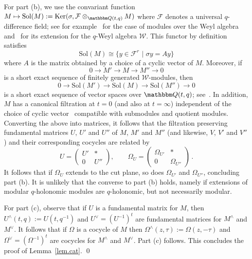 \documentclass[12pt,reqno]{amsart}
\theoremstyle{definition}
\def\BQ{\mathbbm Q}
\def\calF{\mathcal F}
\def\calW{\mathcal W}
\def\s{\sigma}
\def\be{\begin{equation}}
\def\ee{\end{equation}}
\def\Om{\Omega}
\def\Sol{\mathrm{Sol}}
\def\Ker{\mathrm{Ker}}
\begin{document}
For part (b), we use the convariant function
$M \mapsto \Sol(M):=\Ker(\s, \calF \otimes_{\BQ(t,q)} M)$ where $\calF$ denotes a
universal $q$-difference field; see for
example~\cite[Sec.2.2]{Singer:galois-differential} for the case of modules over the
Weyl algebra and~\cite{Hardouin} for its extension for the $q$-Weyl algebra $\calW$.
This functor by definition satisfies~\cite[Lem.2.16]{Singer:galois-differential}
\be
\Sol(M) \cong \{y \in \calF^r \,\, | \,\, \s y=A y\}
\ee
where $A$ is the matrix obtained by a choice of a cyclic vector of $M$. Moreover,
if
$$
0 \to M' \to M \to M'' \to 0
$$
is a short exact sequence of finitely generated $\calW$-modules, then
\be
\label{solexact}
0 \to \Sol(M') \to \Sol(M) \to \Sol(M'') \to 0
\ee
is a short exact sequence of vector spaces over $\BQ(t,q)$;
see~\cite[Sec.2.2]{Singer:galois-differential}. In addition, $M$ has a canonical
filtration at $t=0$ (and also at $t=\infty$) independent of the choice of cyclic
vector~\cite{Sauloy:filtration} compatible with submodules and quotient modules.
Converting the above into matrices, it follows that the filtration preserving
fundamental matrices $U$, $U'$ and $U''$ of $M$, $M'$ and $M''$ (and likewise,
$V$, $V'$ and $V''$) and their corresponding cocycles are related by
\be
U = \begin{pmatrix} U' & * \\ 0 & U'' \end{pmatrix}, \qquad
\Om_U = \begin{pmatrix} \Om_{U'} & * \\ 0 & \Om_{U''} \end{pmatrix} \,.
\ee
It follows that if $\Om_U$ extends to the cut plane, so does $\Om_{U'}$
and $\Om_{U''}$, concluding part (b). It is unlikely that the converse to
part (b) holds, namely if extensions of modular $q$-holonomic modules are
$q$-holonomic, but not necessarily modular.

For part (c), observe that if $U$ is a fundamental matrix for $M$, then
$U^\wedge(t,q):=U(t,q^{-1})$ and $U^\vee=(U^{-1})^t$ are fundamental matrices for
$M^\wedge$ and $M^\vee$. It follows that if $\Om$ is a cocycle of $M$ then
$\Om^\wedge(z,\tau):=\Om(z,-\tau)$ and $\Om^\vee=(\Om^{-1})^t$ are cocycles for
$M^\wedge$ and $M^\vee$. Part (c) follows. This concludes the proof of
Lemma~\ref{lem.cat}.  
\qed


\end{document}
